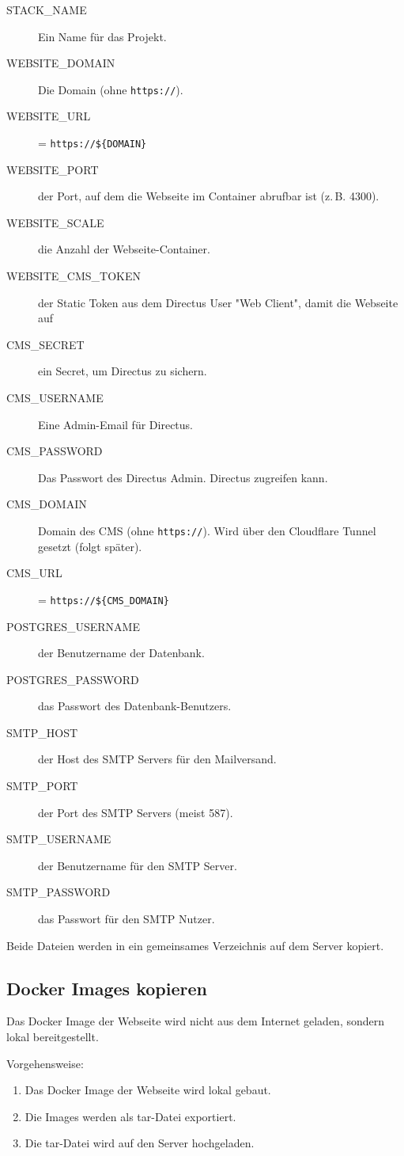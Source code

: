 \begin{description}
    \item[STACK\_NAME] Ein Name für das Projekt.
    \item[WEBSITE\_DOMAIN] Die Domain (ohne \texttt{https://}).
    \item[WEBSITE\_URL] = \texttt{https://\$\{DOMAIN\}}
    \item[WEBSITE\_PORT] der Port, auf dem die Webseite im Container abrufbar ist (z.\,B. 4300).
    \item[WEBSITE\_SCALE] die Anzahl der Webseite-Container.
    \item[WEBSITE\_CMS\_TOKEN] der Static Token aus dem Directus User "Web Client", damit die
    Webseite auf
    \item[CMS\_SECRET] ein Secret, um Directus zu sichern.
    \item[CMS\_USERNAME] Eine Admin-Email für Directus.
    \item[CMS\_PASSWORD] Das Passwort des Directus Admin.  
    Directus zugreifen kann.
    \item[CMS\_DOMAIN] Domain des CMS (ohne \texttt{https://}). Wird über den Cloudflare Tunnel
    gesetzt (folgt später).
    \item[CMS\_URL] = \texttt{https://\$\{CMS\_DOMAIN\}}
    \item[POSTGRES\_USERNAME] der Benutzername der Datenbank.
    \item[POSTGRES\_PASSWORD] das Passwort des Datenbank-Benutzers.
    \item[SMTP\_HOST] der Host des SMTP Servers für den Mailversand.
    \item[SMTP\_PORT] der Port des SMTP Servers (meist 587).
    \item[SMTP\_USERNAME] der Benutzername für den SMTP Server.
    \item[SMTP\_PASSWORD] das Passwort für den SMTP Nutzer.
\end{description}

Beide Dateien werden in ein gemeinsames Verzeichnis auf dem Server kopiert.

\subsection{Docker Images kopieren}

Das Docker Image der Webseite wird nicht aus dem Internet geladen, sondern lokal bereitgestellt.

Vorgehensweise:
\begin{enumerate}
    \item Das Docker Image der Webseite wird lokal gebaut.
    \item Die Images werden als tar-Datei exportiert.
    \item Die tar-Datei wird auf den Server hochgeladen.
\end{enumerate}

